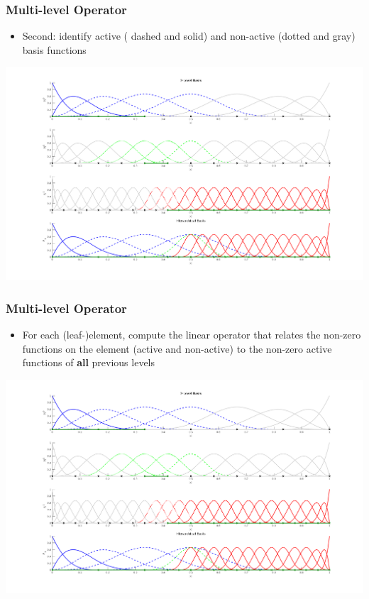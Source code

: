 \documentclass{beamer}
\begin{document}
\begin{frame}
	\frametitle{Multi-level Operator}
	\begin{itemize}
		\item Second: identify active ( dashed and solid) and non-active (dotted and gray) basis functions
	\end{itemize}
	
	
	\includegraphics[width=\textwidth]{operators1d/multiLevelBasis.png}
	
\end{frame}



\begin{frame}
	\frametitle{Multi-level Operator}
	\begin{itemize}
		\item For each (leaf-)element, compute the linear operator that relates the non-zero functions on the element (active and non-active) to the non-zero active functions of \textbf{all} previous levels
	\end{itemize}
	\centering
	\includegraphics[scale=0.22]{operators1d/multiLevelBasis.png}
	
\end{frame}
\end{document}
